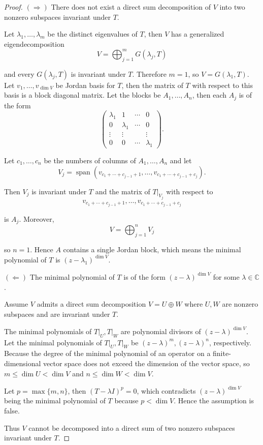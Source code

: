 \begin{proof}
    $(\Rightarrow)$ There does not exist a direct sum decomposition of $V$ into two nonzero subspaces invariant under $T$.

    Let $\lambda_{1}, \ldots, \lambda_{m}$ be the distinct eigenvalues of $T$, then $V$ has a generalized eigendecomposition
    \[
        V = \bigoplus^{m}_{j=1}G(\lambda_{j}, T)
    \]

    and every $G(\lambda_{j}, T)$ is invariant under $T$. Therefore $m = 1$, so $V = G(\lambda_{1}, T)$. Let $v_{1}, \ldots, v_{\dim V}$ be Jordan basis for $T$, then the matrix of $T$ with respect to this basis is a block diagonal matrix. Let the blocks be $A_{1}, \ldots, A_{n}$, then each $A_{j}$ is of the form
    \[
        \begin{pmatrix}
            \lambda_{1} & 1           & \cdots & 0           \\
            0           & \lambda_{1} & \cdots & 0           \\
            \vdots      & \vdots      &        & \vdots      \\
            0           & 0           & \cdots & \lambda_{1}
        \end{pmatrix}.
    \]

    Let $c_{1}, \ldots, c_{n}$ be the numbers of columns of $A_{1}, \ldots, A_{n}$ and let
    \[
        V_{j} = \operatorname{span}(v_{c_{1} + \cdots + c_{j-1}+1}, \ldots, v_{c_{1} + \cdots + c_{j-1} + c_{j}}).
    \]

    Then $V_{j}$ is invariant under $T$ and the matrix of $T\vert_{V_{j}}$ with respect to
    \[
        v_{c_{1} + \cdots + c_{j-1}+1}, \ldots, v_{c_{1} + \cdots + c_{j-1} + c_{j}}
    \]

    is $A_{j}$. Moreover,
    \[
        V = \bigoplus^{n}_{j=1}V_{j}
    \]

    so $n = 1$. Hence $A$ contains a single Jordan block, which means the minimal polynomial of $T$ is ${(z - \lambda_{1})}^{\dim V}$.

    \bigskip
    $(\Leftarrow)$ The minimal polynomial of $T$ is of the form ${(z - \lambda)}^{\dim V}$ for some $\lambda\in\mathbb{C}$.

    Assume $V$ admits a direct sum decomposition $V = U\oplus W$ where $U, W$ are nonzero subspaces and are invariant under $T$.

    The minimal polynomials of $T\vert_{U}, T\vert_{W}$ are polynomial divisors of ${(z - \lambda)}^{\dim V}$. Let the minimal polynomials of $T\vert_{U}, T\vert_{W}$ be ${(z - \lambda)}^{m}, {(z - \lambda)}^{n}$, respectively. Because the degree of the minimal polynomial of an operator on a finite-dimensional vector space does not exceed the dimension of the vector space, so $m\leq \dim U < \dim V$ and $n\leq \dim W < \dim V$.

    Let $p = \max\{m, n\}$, then ${(T - \lambda I)}^{p} = 0$, which contradicts ${(z - \lambda)}^{\dim V}$ being the minimal polynomial of $T$ because $p < \dim V$. Hence the assumption is false.

    Thus $V$ cannot be decomposed into a direct sum of two nonzero subspaces invariant under $T$.
\end{proof}
\newpage

